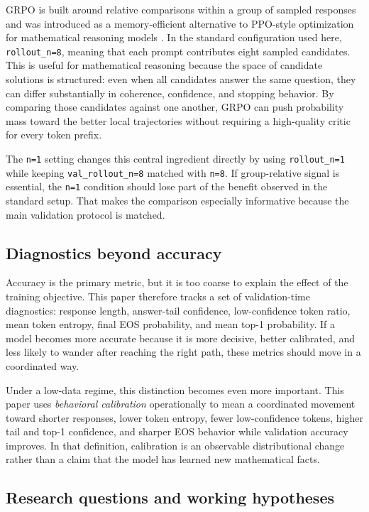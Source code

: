 \documentclass[12pt,a4paper]{ctexart}
\begin{document}
GRPO is built around relative comparisons within a group of sampled responses and was introduced as a memory-efficient alternative to PPO-style optimization for mathematical reasoning models \cite{deepseekmath,ppo}. In the standard configuration used here, \texttt{rollout\_n=8}, meaning that each prompt contributes eight sampled candidates. This is useful for mathematical reasoning because the space of candidate solutions is structured: even when all candidates answer the same question, they can differ substantially in coherence, confidence, and stopping behavior. By comparing those candidates against one another, GRPO can push probability mass toward the better local trajectories without requiring a high-quality critic for every token prefix.

The \texttt{n=1} setting changes this central ingredient directly by using \texttt{rollout\_n=1} while keeping \texttt{val\_rollout\_n=8} matched with \texttt{n=8}. If group-relative signal is essential, the \texttt{n=1} condition should lose part of the benefit observed in the standard setup. That makes the comparison especially informative because the main validation protocol is matched.

\subsection{Diagnostics beyond accuracy}

Accuracy is the primary metric, but it is too coarse to explain the effect of the training objective. This paper therefore tracks a set of validation-time diagnostics: response length, answer-tail confidence, low-confidence token ratio, mean token entropy, final EOS probability, and mean top-1 probability. If a model becomes more accurate because it is more decisive, better calibrated, and less likely to wander after reaching the right path, these metrics should move in a coordinated way.

Under a low-data regime, this distinction becomes even more important. This paper uses \emph{behavioral calibration} operationally to mean a coordinated movement toward shorter responses, lower token entropy, fewer low-confidence tokens, higher tail and top-1 confidence, and sharper EOS behavior while validation accuracy improves. In that definition, calibration is an observable distributional change rather than a claim that the model has learned new mathematical facts.

\subsection{Research questions and working hypotheses}
\end{document}
